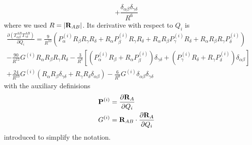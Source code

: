 \documentclass[a4paper,titlepage,twoside,fleqn,12pt]{book}
\newcommand{\fderiv}[2]{\ensuremath{
    \frac{\partial #1}{\partial #2}}}
\begin{document}
\begin{refsection}
\begin{equation}
 + \frac{\delta_{\alpha\beta}\delta_{\gamma\delta}}{R^6}
\end{equation}
%
where we used $R=\left|{\bf R}_{AB}\right|$.
Its derivative with respect to $Q_i$ is
%
\begin{multline} \label{e:happylabel}
 \fderiv{\left( T^{AB}_{\alpha\beta} T^{AB}_{\gamma\delta} \right)}{Q_i} = 
  \frac{9}{R^{10}} 
   \left( 
     P^{(i)}_\alpha R_\beta R_\gamma R_\delta + 
     R_\alpha P^{(i)}_\beta R_\gamma R_\delta +
     R_\alpha R_\beta P^{(i)}_\gamma R_\delta +
     R_\alpha R_\beta R_\gamma P^{(i)}_\delta
   \right) \\
    - \frac{90}{R^{12}}
       G^{(i)} R_\alpha R_\beta R_\gamma R_\delta
    - \frac{3}{R^8} 
      \left[ 
          \left( P^{(i)}_\alpha R_\beta  + R_\alpha P^{(i)}_\beta \right)\delta_{\gamma\delta}
        + \left( P^{(i)}_\gamma R_\delta + R_\gamma P^{(i)}_\delta\right)\delta_{\alpha\beta}
      \right] \\
   + \frac{24}{R^{10}} G^{(i)} 
      \left( 
       R_\alpha R_\beta  \delta_{\gamma\delta} 
     + R_\gamma R_\delta \delta_{\alpha\beta} 
      \right) 
   - \frac{6}{R^{8}} G^{(i)} \delta_{\alpha\beta}  \delta_{\gamma\delta}
\end{multline}
%
with the auxiliary definisions
%
\begin{subequations} 
 \begin{align}
   {\bf P}^{(i)} &= \fderiv{{\bf R}_A}{Q_i}                    \label{e:pi} \\
   G^{(i)}       &= {\bf R}_{AB} \cdot \fderiv{{\bf R}_A}{Q_i} \label{e:gi}
 \end{align}
\end{subequations}
%
introduced to simplify the notation.


\end{refsection}
\end{document}
